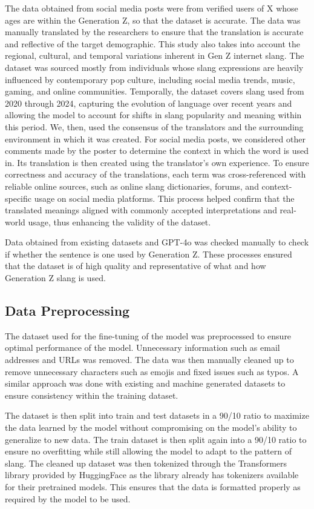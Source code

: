The data obtained from social media posts were from verified users of X whose ages are within the Generation Z, so that the dataset is accurate. The data was manually translated by the researchers to ensure that the translation is accurate and reflective of the target demographic. This study also takes into account the regional, cultural, and temporal variations inherent in Gen Z internet slang. The dataset was sourced mostly from individuals whose slang expressions are heavily influenced by contemporary pop culture, including social media trends, music, gaming, and online communities. Temporally, the dataset covers slang used from 2020 through 2024, capturing the evolution of language over recent years and allowing the model to account for shifts in slang popularity and meaning within this period. We, then, used the consensus of the translators and the surrounding environment in which it was created. For social media posts, we considered other comments made by the poster to determine the context in which the word is used in. Its translation is then created using the translator’s own experience. To ensure correctness and accuracy of the translations, each term was cross-referenced with reliable online sources, such as online slang dictionaries, forums, and context-specific usage on social media platforms. This process helped confirm that the translated meanings aligned with commonly accepted interpretations and real-world usage, thus enhancing the validity of the dataset. 

Data obtained from existing datasets and GPT-4o was checked manually to check if whether the sentence is one used by Generation Z. These processes ensured that the dataset is of high quality and representative of what and how Generation Z slang is used.

\subsection{Data Preprocessing} 
The dataset used for the fine-tuning of the model was preprocessed to ensure optimal performance of the model.
Unnecessary information such as email addresses and URLs was removed. The data was then manually cleaned up to remove unnecessary characters such as emojis and fixed issues such as typos. A similar approach was done with existing and machine generated datasets to ensure consistency within the training dataset.

The dataset is then split into train and test datasets in a 90/10 ratio to maximize the data learned by the model without compromising on the model's ability to generalize to new data. The train dataset is then split again into a 90/10 ratio to ensure no overfitting while still allowing the model to adapt to the pattern of slang. The cleaned up dataset was then tokenized through the Transformers library provided by HuggingFace as the library already has tokenizers available for their pretrained models.
This ensures that the data is formatted properly as required by the model to be used.

